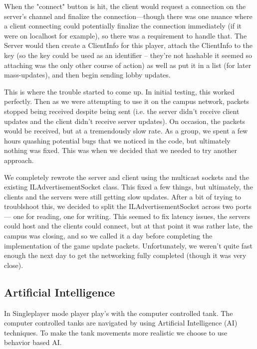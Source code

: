 \documentclass[letterpaper,11pt,twoside]{article}
\begin{document}
When the "connect" button is hit, the client would request a connection on the server's channel and finalize the connection---though there was one nuance where a client connecting could potentially finalize the connection immediately (if it were on localhost for example), so there was a requirement to handle that. The Server would then create a ClientInfo for this player, attach the ClientInfo to the key (so the key could be used as an identifier -- they're not hashable it seemed so attaching was the only other course of action) as well as put it in a list (for later mass-updates), and then begin sending lobby updates.

This is where the trouble started to come up. In initial testing, this worked perfectly. Then as we were attempting to use it on the campus network, packets stopped being received despite being sent (i.e. the server didn't receive client updates and the client didn't receive server updates). On occasion, the packets would be received, but at a tremendously slow rate. As a group, we spent a few hours quashing potential bugs that we noticed in the code, but ultimately nothing was fixed. This was when we decided that we needed to try another approach.

We completely rewrote the server and client using the multicast sockets and the existing ILAdvertisementSocket class. This fixed a few things, but ultimately, the clients and the servers were still getting slow updates. After a bit of trying to troublshoot this, we decided to split the ILAdvertisementSocket across two ports --- one for reading, one for writing. This seemed to fix latency issues, the servers could host and the clients could connect, but at that point it was rather late, the campus was closing, and so we called it a day before completing the implementation of the game update packets. Unfortunately, we weren't quite fast enough the next day to get the networking fully completed (though it was very close).

\subsection{Artificial Intelligence}
In Singleplayer mode player play's with the computer controlled tank. The computer controlled tanks are navigated by using Artificial Intelligence (AI) techniques. To make the tank movements more realistic we choose to use behavior based AI. 
\end{document}
